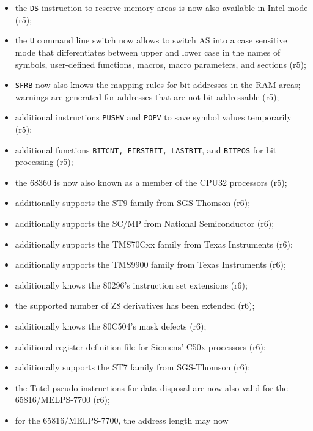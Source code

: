 \documentclass[12pt,twoside]{report}
\newcommand{\tty}[1]{{\tt #1}}
\begin{document}
\begin{itemize}
{\begin{itemize}
{            appropriately (r5);}
      \item{the \tty{DS} instruction to reserve memory areas is now
            also available in Intel mode (r5);}
      \item{the \tty{U} command line switch now allows to switch AS
            into a case sensitive mode that differentiates
            between upper and lower case in the names of symbols,
            user-defined functions, macros, macro parameters, and
            sections (r5);}
      \item{\tty{SFRB} now also knows the mapping rules for bit
            addresses in the RAM areas; warnings are generated
            for addresses that are not bit addressable (r5);}
      \item{additional instructions \tty{PUSHV} and \tty{POPV} to save symbol
            values temporarily (r5);}
      \item{additional functions \tty{BITCNT, FIRSTBIT, LASTBIT}, and
            \tty{BITPOS} for bit processing (r5);}
      \item{the 68360 is now also known as a member of the CPU32
            processors (r5);}
      \item{additionally supports the ST9 family from SGS-Thomson
            (r6);}
      \item{additionally supports the SC/MP from National
            Semiconductor (r6);}
      \item{additionally supports the TMS70Cxx family from Texas
            Instruments (r6);}
      \item{additionally supports the TMS9900 family from Texas
            Instruments (r6);}
      \item{additionally knows the 80296's instruction set
            extensions (r6);}
      \item{the supported number of Z8 derivatives has been
            extended (r6);}
      \item{additionally knows the 80C504's mask defects (r6);}
      \item{additional register definition file for Siemens' C50x
            processors (r6);}
      \item{additionally supports the ST7 family from SGS-Thomson
            (r6);}
      \item{the Tntel pseudo instructions for data disposal are
            now also valid for the 65816/MELPS-7700 (r6);}
      \item{for the 65816/MELPS-7700, the address length may now
}
\end{itemize}}
\end{itemize}
\end{document}
